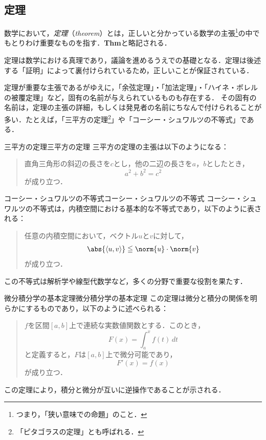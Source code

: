 \subsection{定理}

数学において，\emph{定理}（\emph{theorem}）とは，正しいと分かっている数学の主張\footnote{つまり，「狭い意味での命題」のこと．}の中でもとりわけ重要なものを指す．\textbf{Thm}と略記される．


定理は数学における真理であり，議論を進めるうえでの基礎となる．定理は後述する「証明」によって裏付けられているため，正しいことが保証されている．

定理が重要な主張であるがゆえに，「余弦定理」・「加法定理」・「ハイネ・ボレルの被覆定理」など，固有の名前が与えられているものも存在する．
その固有の名前は，定理の主張の詳細，もしくは発見者の名前にちなんで付けられることが多い．たとえば，「三平方の定理\footnote{「ピタゴラスの定理」とも呼ばれる．}」や「コーシー・シュワルツの不等式」である．

\begin{example}{三平方の定理}{三平方の定理}
  三平方の定理の主張は以下のようになる：
  \begin{quotation}
    直角三角形の斜辺の長さを$c$とし，他の二辺の長さを$a$，$b$としたとき，
    \[
      a^2+b^2=c^2
    \]
    が成り立つ．
  \end{quotation}
\end{example}

\begin{example}{コーシー・シュワルツの不等式}{コーシー・シュワルツの不等式}
  コーシー・シュワルツの不等式は，内積空間における基本的な不等式であり，以下のように表される：
  \begin{quotation}
    任意の内積空間において，ベクトル$u$と$v$に対して，
    \[
      \abs{\langle u, v \rangle} \leqq \norm{u} \cdot \norm{v}
    \]
    が成り立つ．
  \end{quotation}
  この不等式は解析学や線型代数学など，多くの分野で重要な役割を果たす．
\end{example}

\begin{example}{微分積分学の基本定理}{微分積分学の基本定理}
  この定理は微分と積分の関係を明らかにするものであり，以下のように述べられる：
  \begin{quotation}
    $f$を区間$[a, b]$上で連続な実数値関数とする．このとき，
    \[
      F(x) = \int_a^x f(t) \, dt
    \]
    と定義すると，$F$は$[a, b]$上で微分可能であり，
    \[
      F'(x) = f(x)
    \]
    が成り立つ．
  \end{quotation}
  この定理により，積分と微分が互いに逆操作であることが示される．
\end{example}
